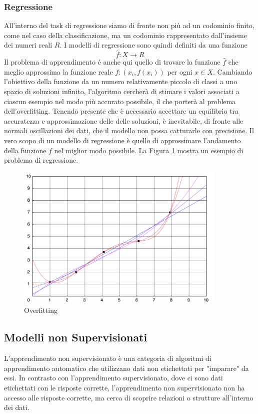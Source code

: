 \subsubsection{Regressione}
All'interno del task di regressione siamo di fronte non più ad un codominio finito, come nel caso della classificazione, ma un codominio rappresentato dall'insieme dei numeri reali \(R\). I modelli di regressione sono quindi definiti da una funzione
\[\hat{f}: X \rightarrow R\]
Il problema di apprendimento é anche qui quello di trovare la funzione \(\hat{f}\) che meglio approssima la funzione reale \(f: (x_i, f(x_i))\) per ogni \(x\in X\).
Cambiando l'obiettivo della funzione da un numero relativamente piccolo di classi a uno spazio di soluzioni infinito, l'algoritmo cercherà di stimare i valori associati a ciascun esempio nel modo più accurato possibile, il che porterà al problema dell'overfitting. Tenendo presente che è necessario accettare un equilibrio tra accuratezza e approssimazione delle delle soluzioni, è inevitabile, di fronte alle normali oscillazioni dei dati, che il modello non possa catturarle con precisione. Il vero scopo di un modello di regressione è quello di approssimare l'andamento della funzione $f$ nel miglior modo possibile. La Figura \ref{overfitting} mostra un esempio di problema di regressione.

\begin{figure}[t]
	\centering
	\includegraphics[width=10cm, scale=1]{images/overfitting}
	\caption{Overfitting}
	\label{overfitting}
\end{figure}


\subsection{Modelli non Supervisionati}
L'apprendimento non supervisionato è una categoria di algoritmi di apprendimento automatico che utilizzano dati non etichettati per "imparare" da essi. In contrasto con l'apprendimento supervisionato, dove ci sono dati etichettati con le risposte corrette, l'apprendimento non supervisionato non ha accesso alle risposte corrette, ma cerca di scoprire relazioni o strutture all'interno dei dati.

